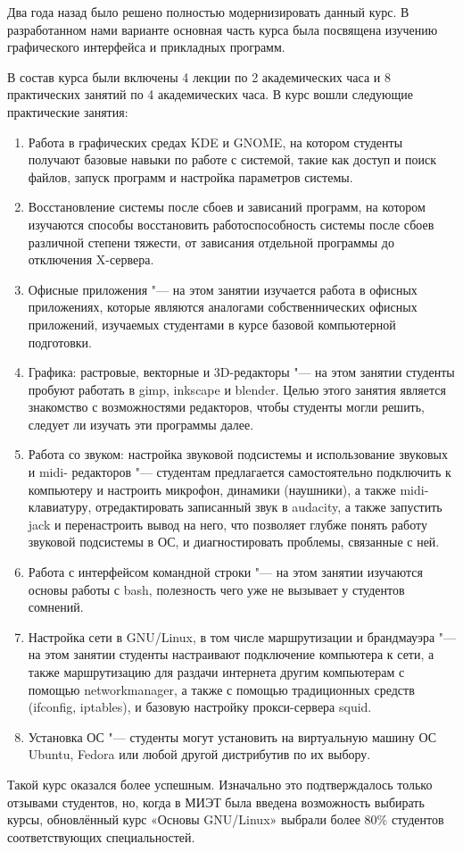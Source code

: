 \documentclass[10pt, a5paper]{article}
\begin{document}
Два года назад было решено полностью модернизировать данный курс. В разработанном нами варианте основная часть курса была посвящена изучению графического интерфейса и прикладных программ.

В состав курса были включены 4 лекции по 2 академических часа и 8 практических занятий по 4 академических часа. 
В курс вошли следующие практические занятия:

\begin{enumerate}
  \item Работа в графических средах KDE и GNOME, на котором студенты получают базовые навыки по работе с системой, такие как доступ и поиск файлов, запуск программ и настройка параметров системы.
  \item Восстановление системы после сбоев и зависаний программ, на котором изучаются способы восстановить работоспособность системы после сбоев различной степени тяжести, от зависания отдельной программы до отключения X-сервера.
  \item Офисные приложения "--- на этом занятии изучается работа в офисных приложениях, которые являются аналогами собственнических офисных приложений, изучаемых студентами в курсе базовой компьютерной подготовки.
  \item Графика: растровые, векторные и 3D-редакторы "--- на этом занятии студенты пробуют работать в gimp, inkscape и blender. Целью этого занятия является знакомство с возможностями редакторов, чтобы студенты могли решить, следует ли изучать эти программы далее.
  \item Работа со звуком: настройка звуковой подсистемы и использование звуковых и midi- редакторов "--- студентам предлагается самостоятельно подключить к компьютеру и настроить микрофон, динамики (наушники), а также midi-клавиатуру, отредактировать записанный звук в audacity, а также запустить jack и перенастроить вывод на него, что позволяет глубже понять работу звуковой подсистемы в ОС, и диагностировать проблемы, связанные с ней.
  \item Работа с интерфейсом командной строки "--- на этом занятии изучаются основы работы с bash, полезность чего уже не вызывает у студентов сомнений.
  \item Настройка сети в GNU/Linux, в том числе маршрутизации и брандмауэра "--- на этом занятии студенты настраивают подключение компьютера к сети, а также маршрутизацию для раздачи интернета другим компьютерам с помощью networkmanager, а также с помощью традиционных средств (ifconfig, iptables), и базовую настройку прокси-сервера squid.
  \item Установка ОС "--- студенты могут установить на виртуальную машину ОС Ubuntu, Fedora или любой другой дистрибутив по их выбору.
\end{enumerate}

Такой курс оказался более успешным. Изначально это подтверждалось только отзывами студентов, но, когда в МИЭТ была введена возможность выбирать курсы, обновлённый курс «Основы GNU/Linux» выбрали более 80\% студентов соответствующих специальностей.
\end{document}

